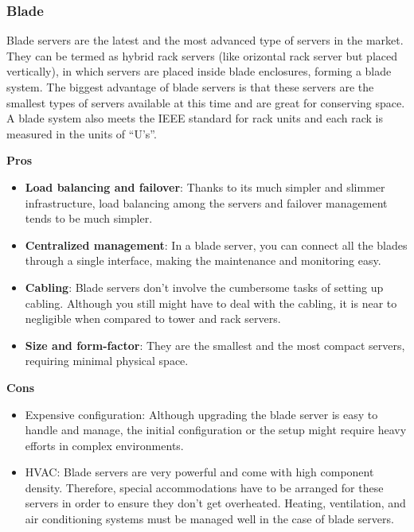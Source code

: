 \documentclass[10pt, oneside]{article}
\begin{document}
  
\subsubsection{Blade}
Blade servers are the latest and the most advanced type of servers in the market. They can be termed as hybrid rack servers (like orizontal rack server but placed vertically), in which servers are placed inside blade enclosures, forming a blade system. The biggest advantage of blade servers is that these servers are the smallest types of servers available at this time and are great for conserving space. A blade system also meets the IEEE standard for rack units and each rack is measured in the units of “U’s”.
\begin{multicols}{2}
\noindent
{\bf \color{green}Pros\color{black}}
\begin{itemize}
    \item {\bf Load balancing and failover}: Thanks to its much simpler and slimmer infrastructure, load balancing among the servers and failover management tends to be much simpler.
    \item {\bf Centralized management}: In a blade server, you can connect all the blades through a single interface, making the maintenance and monitoring easy.
    \item {\bf Cabling}: Blade servers don't involve the cumbersome tasks of setting up cabling. Although you still might have to deal with the cabling, it is near to negligible when compared to tower and rack servers.
    \item {\bf Size and form-factor}: They are the smallest and the most compact servers, requiring minimal physical space.
\end{itemize}
\columnbreak
\noindent
\bf{ \color{red}Cons\color{black}}
\begin{itemize}
    \item Expensive configuration: Although upgrading the blade server is easy to handle and manage, the initial configuration or the setup might require heavy efforts in complex environments.
    \item HVAC: Blade servers are very powerful and come with high component density. Therefore, special accommodations have to be arranged for these servers in order to ensure they don't get overheated. Heating, ventilation, and air conditioning systems must be managed well in the case of blade servers.
\end{itemize}
\end{multicols}
\end{document}
